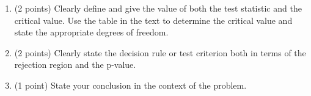 \documentclass{article}
\begin{document}
\begin{enumerate}
\begin{enumerate}
	
		\item (2 points) Clearly define and give the value of both the test statistic and the critical value. Use the table in the text to determine the critical value and state the appropriate degrees of freedom.

		\item (2 points) Clearly state the decision rule or test criterion both in terms of the rejection region and the p-value.	
	
		\item (1 point) State your conclusion in the context of the problem.
		
	
	
	
	
	\end{enumerate}
	
	
	


	
		
\end{enumerate}
\end{document}
